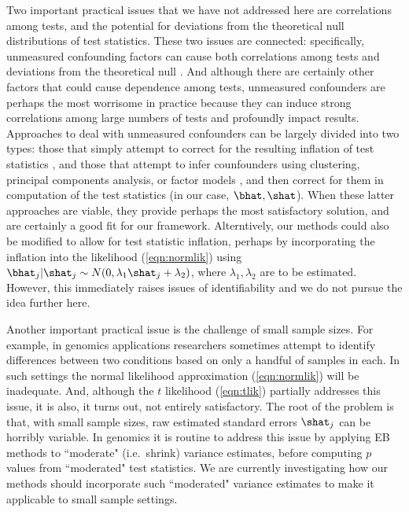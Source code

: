 Two important practical issues that we have not addressed here are correlations among tests,
and the potential for deviations from the theoretical null distributions of test statistics. These two
issues are connected: specifically, unmeasured confounding factors can cause both correlations among tests
and deviations from the theoretical null \cite{efron2007correlation,leek:2007}. And although there are certainly other
factors that could cause dependence among tests, unmeasured confounders are perhaps the most worrisome in practice
because they can induce strong correlations among large numbers of tests and profoundly impact results.
Approaches to deal with unmeasured confounders can be largely divided into two types: those
that simply attempt to correct for the resulting inflation of test statistics \cite{devlin1999genomic,efron2004large}, and those
that attempt to infer counfounders using clustering, principal components analysis, or factor models 
\cite{pritchard.stephens.rosenberg.donnelly.00,price:2006,leek:2007,gagnon2012using},
and then correct for them in computation of the test statistics (in our case, $\bhat,\shat$). When these latter approaches are viable,
they provide perhaps the most satisfactory solution, and are certainly a good fit for our framework. Alterntively, our methods
could also be modified to allow for test statistic inflation, perhaps by incorporating the inflation into the likelihood (\ref{eqn:normlik}) using
$\bhat_j | \shat_j \sim N(0,\lambda_1 \shat_j + \lambda_2)$, where $\lambda_1,\lambda_2$ are to be estimated. However,
this immediately raises issues of identifiability and we do not pursue the idea further here.

Another important practical issue is the challenge of small sample sizes. For example, in genomics applications researchers sometimes
attempt to identify differences between two conditions based on only a handful of samples in each. In such settings the
normal likelihood approximation (\ref{eqn:normlik}) will be inadequate. And, although the $t$ likelihood (\ref{eqn:tlik}) partially
addresses this issue, it is also, it turns out, not entirely satisfactory.  The root of the problem is that, with small sample sizes, raw estimated standard
errors $\shat_j$ can be horribly variable. In genomics it is routine to address this issue by applying EB methods \cite{smyth:2004} to ``moderate" (i.e.~shrink) variance estimates,
before computing $p$ values from ``moderated" test statistics. We are currently investigating how
our methods should incorporate such ``moderated" variance estimates to make it applicable to small sample settings.

